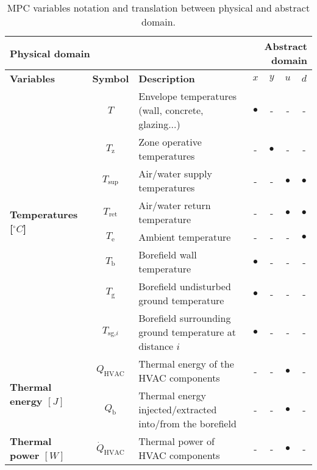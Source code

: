 \documentclass[10pt]{extarticle}
\begin{document}
\begin{table}[ht]
	\centering
	\caption{MPC variables notation and translation between physical and abstract domain.}
	\label{tab:mpc_form:translation}
	\begin{adjustwidth}{-1cm}{}
	\begin{tabular}{l|c|l|cccc}
		\toprule
		\multicolumn{3}{l}{\textbf{Physical domain}} &  \multicolumn{4}{r}{\textbf{Abstract domain}} \\
		\toprule
		\textbf{Variables} & \textbf{Symbol} & \textbf{Description} & \textbf{$x$} & \textbf{$y$} & \textbf{$u$} & \textbf{$d$}  \\ 
		\midrule
		\multirow{8}{*}{\textbf{Temperatures [$^\circ C$]}} & $T$ & Envelope temperatures (wall, concrete, glazing...) & $\bullet$ & -  & - & - \\ 
		& $T_{\text{z}}$ & Zone operative temperatures  & - & $\bullet$ & -  & - \\
		& $T_{\text{sup}}$ & Air/water supply temperatures &  - & - & $\bullet$ & $\bullet$  \\
		& $T_{\text{ret}}$ & Air/water return temperature &  - & - & $\bullet$ &  $\bullet$ \\
		& $T_\text{e}$ & Ambient temperature &  - & - & - & $\bullet$ \\
		& $T_\text{b}$ & Borefield wall temperature & $\bullet$ & - & - & - \\
			& $T_\text{g}$ & Borefield undisturbed ground temperature & $\bullet$ & - & - & - \\
			& $T_{\text{sg,}i}$ & Borefield surrounding ground temperature at distance $i$ & $\bullet$ & - & - & - \\
		\midrule
		\multirow{2}{*}{\textbf{Thermal energy $[J]$}} 
		& $Q_{\text{HVAC}}$ & Thermal energy of the HVAC components  & - & - &  $\bullet$ & - \\
		& $Q_{\text{b}}$ & Thermal energy injected/extracted into/from the borefield & - & - & $\bullet$ & -  \\
		\midrule
		\multirow{5}{*}{\textbf{Thermal power $[W]$}} 
		& $\dot{Q}_{\text{HVAC}}$ & Thermal power of  HVAC components  & - & - &  $\bullet$ &- \\

\end{tabular}
\end{adjustwidth}
\end{table}
\end{document}

